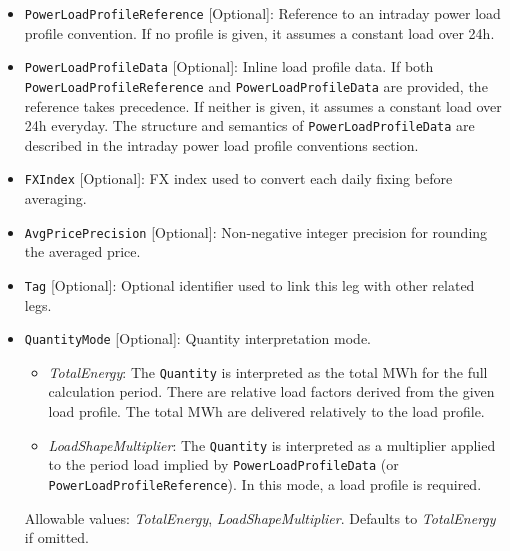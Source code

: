 \begin{itemize}
Allowable values: \emph{true}, \emph{false}. Defaults to \emph{true} if omitted.

\item
\lstinline!PowerLoadProfileReference! [Optional]: Reference to an intraday power load profile convention. If no profile is given, it assumes a constant load over 24h.

\item
\lstinline!PowerLoadProfileData! [Optional]: Inline load profile data. If both \lstinline!PowerLoadProfileReference! and \lstinline!PowerLoadProfileData! are provided, the reference takes precedence. If neither is given, it assumes a constant load over 24h everyday. The structure and semantics of \lstinline!PowerLoadProfileData! are described in the intraday power load profile conventions section.

\item
\lstinline!FXIndex! [Optional]: FX index used to convert each daily fixing before averaging.

\item
\lstinline!AvgPricePrecision! [Optional]: Non-negative integer precision for rounding the averaged price.

\item
\lstinline!Tag! [Optional]: Optional identifier used to link this leg with other related legs.

\item
\lstinline!QuantityMode! [Optional]: Quantity interpretation mode. 

\begin{itemize}
\item \emph{TotalEnergy}: The \lstinline!Quantity! is interpreted as the total MWh for the full calculation period. There are relative load factors derived from the given load profile. The total MWh are delivered relatively to the load profile.
\item \emph{LoadShapeMultiplier}: The \lstinline!Quantity! is interpreted as a multiplier applied to the period load implied by \lstinline!PowerLoadProfileData! (or \lstinline!PowerLoadProfileReference!). In this mode, a load profile is required.
\end{itemize}

Allowable values: \emph{TotalEnergy}, \emph{LoadShapeMultiplier}. Defaults to \emph{TotalEnergy} if omitted.

\end{itemize}

